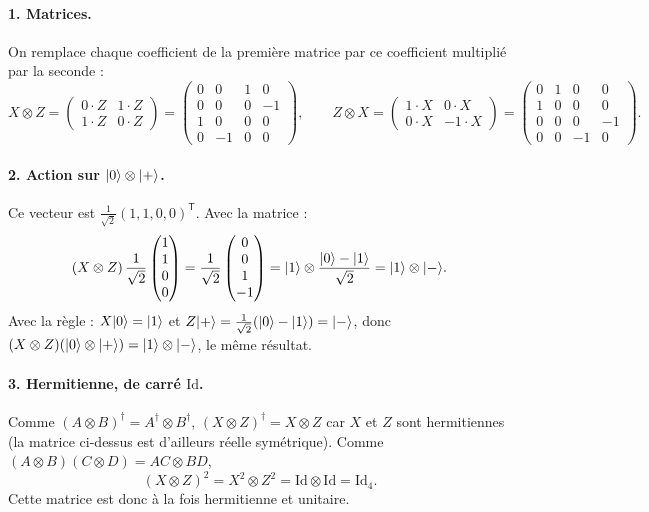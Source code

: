 \begin{correction}
\paragraph{1. Matrices.} On remplace chaque coefficient de la première matrice par ce coefficient
multiplié par la seconde :
\[
  X\otimes Z=\begin{pmatrix}0\cdot Z&1\cdot Z\\1\cdot Z&0\cdot Z\end{pmatrix}
  =\begin{pmatrix}0&0&1&0\\0&0&0&-1\\1&0&0&0\\0&-1&0&0\end{pmatrix},
  \qquad
  Z\otimes X=\begin{pmatrix}1\cdot X&0\cdot X\\0\cdot X&-1\cdot X\end{pmatrix}
  =\begin{pmatrix}0&1&0&0\\1&0&0&0\\0&0&0&-1\\0&0&-1&0\end{pmatrix}.
\]

\paragraph{2. Action sur $|0\rangle\otimes|+\rangle$.} Ce vecteur est
$\frac{1}{\sqrt2}(1,1,0,0)^{\mathsf T}$. Avec la matrice :
\[
  (X\otimes Z)\,\frac{1}{\sqrt2}\begin{pmatrix}1\\1\\0\\0\end{pmatrix}
  =\frac{1}{\sqrt2}\begin{pmatrix}0\\0\\1\\-1\end{pmatrix}
  =|1\rangle\otimes\frac{|0\rangle-|1\rangle}{\sqrt2}=|1\rangle\otimes|-\rangle.
\]
Avec la règle : $X|0\rangle=|1\rangle$ et $Z|+\rangle=\frac{1}{\sqrt2}(|0\rangle-|1\rangle)=|-\rangle$, donc
$(X\otimes Z)(|0\rangle\otimes|+\rangle)=|1\rangle\otimes|-\rangle$, le même résultat.

\paragraph{3. Hermitienne, de carré $\mathrm{Id}$.} Comme $(A\otimes B)^\dagger=A^\dagger\otimes B^\dagger$,
$(X\otimes Z)^\dagger=X\otimes Z$ car $X$ et $Z$ sont hermitiennes (la matrice ci-dessus est d'ailleurs
réelle symétrique). Comme $(A\otimes B)(C\otimes D)=AC\otimes BD$,
\[
  (X\otimes Z)^2=X^2\otimes Z^2=\mathrm{Id}\otimes\mathrm{Id}=\mathrm{Id}_4 .
\]
Cette matrice est donc à la fois hermitienne et unitaire.


\end{correction}
